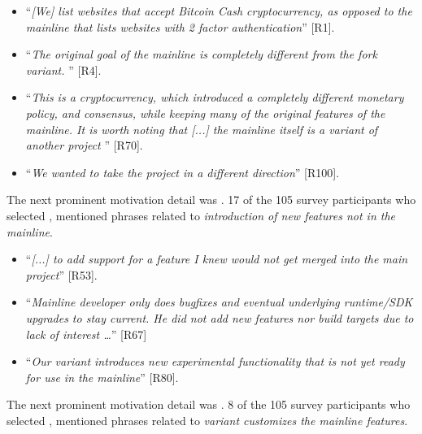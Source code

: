 \begin{itemize}[leftmargin=*]
\item ``\emph{[We] %
list websites that accept Bitcoin Cash cryptocurrency, as opposed to the mainline that lists websites with 2 factor authentication}'' [R1].
\item ``\emph{The original goal of the mainline is completely different from the fork variant. %
}'' [R4].
\item ``\emph{This is a cryptocurrency, which introduced a completely different monetary policy, and consensus, while keeping many of the original features of the mainline. It is worth noting that [...] %
the mainline itself is a variant of another project%
}'' [R70].
\item  ``\emph{We wanted to take the project in a different direction}'' [R100].
\end{itemize}

\nd The next prominent  motivation detail was .
17 of the 105 survey participants who selected , mentioned phrases related to \emph{introduction of new features not in the mainline}.

\begin{itemize}[leftmargin=*]
\item ``\emph{[...] to add support for a feature I knew would not get merged into the main project}'' [R53].
\item ``\emph{Mainline developer only does bugfixes and eventual underlying runtime/SDK upgrades to stay current. He did not add new features nor build targets due to lack of interest \ldots}'' [R67]
\item ``\emph{Our variant introduces new experimental functionality that is not yet ready for use in the mainline}'' [R80].
\end{itemize}

\nd The next prominent  motivation detail was .
8 of the 105 survey participants who selected , mentioned phrases related to \emph{variant customizes the mainline features}.

